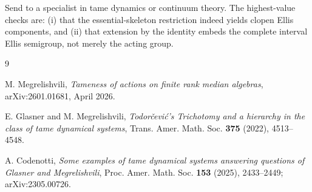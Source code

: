 \documentclass[11pt]{article}
\begin{document}
Send to a specialist in tame dynamics or continuum theory. The highest-value
checks are: (i) that the essential-skeleton restriction indeed yields clopen
Ellis components, and (ii) that extension by the identity embeds the complete
interval Ellis semigroup, not merely the acting group.

\begin{thebibliography}{9}

M. Megrelishvili,
\emph{Tameness of actions on finite rank median algebras},
arXiv:2601.01681, April 2026.

E. Glasner and M. Megrelishvili,
\emph{Todor\v{c}evi\'c's Trichotomy and a hierarchy in the class of tame
dynamical systems},
Trans. Amer. Math. Soc. \textbf{375} (2022), 4513--4548.

A. Codenotti,
\emph{Some examples of tame dynamical systems answering questions of Glasner
and Megrelishvili},
Proc. Amer. Math. Soc. \textbf{153} (2025), 2433--2449;
arXiv:2305.00726.

\end{thebibliography}
\end{document}
